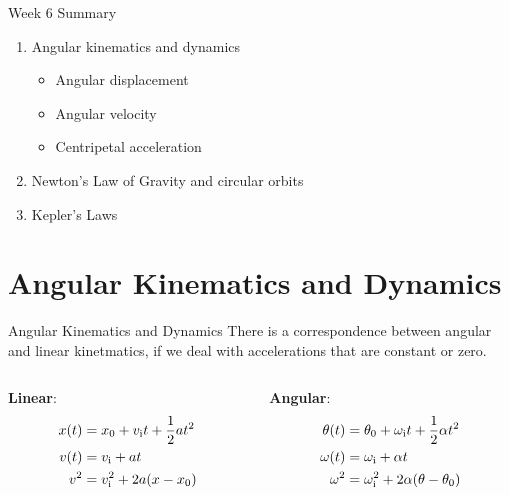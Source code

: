 \documentclass{beamer}
\begin{document}
\begin{frame}{Week 6 Summary}
\begin{enumerate}
\item \alert{Angular} kinematics and dynamics
\begin{itemize}
\item Angular displacement
\item Angular velocity
\item Centripetal acceleration
\end{itemize}
\item \alert{Newton's Law of Gravity} and circular orbits
\item Kepler's Laws
\end{enumerate}
\end{frame}

\section{Angular Kinematics and Dynamics}

\begin{frame}{Angular Kinematics and Dynamics}
There is a correspondence between \alert{angular and linear kinetmatics}, if we deal with accelerations that are constant or zero.
\begin{columns}[T]
\begin{column}{0.5\textwidth}
\centering
\textbf{Linear}:
\begin{align}
x(t) &= x_{\rm 0} + v_{\rm i}t + \frac{1}{2}at^2 \\
v(t) &= v_{\rm i} + at \\
v^2 &= v_{\rm i}^2 + 2a(x-x_{\rm 0})
\end{align}
\end{column}
\begin{column}{0.5\textwidth}
\centering
\textbf{Angular}:
\begin{align}
\theta(t) &= \theta_{\rm 0} + \omega_{\rm i}t + \frac{1}{2}\alpha t^2 \\
\omega(t) &= \omega_{\rm i} + \alpha t \\
\omega^2 &= \omega_{\rm i}^2 + 2\alpha(\theta-\theta_{\rm 0})
\end{align}
\end{column}
\end{columns}
\end{frame}
\end{document}

